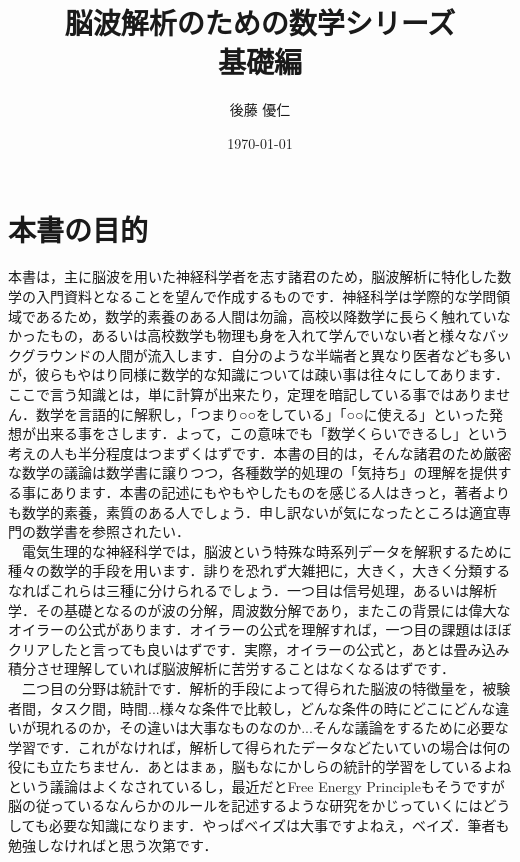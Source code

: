 \documentclass[11pt,a4paper]{ujreport}
\title{脳波解析のための数学シリーズ\\
基礎編}
\author{後藤 優仁}
\date{\today}
\begin{document}
\maketitle
%
%
\tableofcontents

\newpage
\section{本書の目的}
本書は，主に脳波を用いた神経科学者を志す諸君のため，脳波解析に特化した数学の入門資料となることを望んで作成するものです．神経科学は学際的な学問領域であるため，数学的素養のある人間は勿論，高校以降数学に長らく触れていなかったもの，あるいは高校数学も物理も身を入れて学んでいない者と様々なバックグラウンドの人間が流入します．自分のような半端者と異なり医者なども多いが，彼らもやはり同様に数学的な知識については疎い事は往々にしてあります．ここで言う知識とは，単に計算が出来たり，定理を暗記している事ではありません．数学を言語的に解釈し，「つまり○○をしている」「○○に使える」といった発想が出来る事をさします．よって，この意味でも「数学くらいできるし」という考えの人も半分程度はつまずくはずです．本書の目的は，そんな諸君のため厳密な数学の議論は数学書に譲りつつ，各種数学的処理の「気持ち」の理解を提供する事にあります．本書の記述にもやもやしたものを感じる人はきっと，著者よりも数学的素養，素質のある人でしょう．申し訳ないが気になったところは適宜専門の数学書を参照されたい．\\
　電気生理的な神経科学では，脳波という特殊な時系列データを解釈するために種々の数学的手段を用います．誹りを恐れず大雑把に，大きく，大きく分類するなればこれらは三種に分けられるでしょう．一つ目は信号処理，あるいは解析学．その基礎となるのが波の分解，周波数分解であり，またこの背景には偉大なオイラーの公式があります．オイラーの公式を理解すれば，一つ目の課題はほぼクリアしたと言っても良いはずです．実際，オイラーの公式と，あとは畳み込み積分させ理解していれば脳波解析に苦労することはなくなるはずです．\\
　二つ目の分野は統計です．解析的手段によって得られた脳波の特徴量を，被験者間，タスク間，時間...様々な条件で比較し，どんな条件の時にどこにどんな違いが現れるのか，その違いは大事なものなのか...そんな議論をするために必要な学習です．これがなければ，解析して得られたデータなどたいていの場合は何の役にも立たちません．あとはまぁ，脳もなにかしらの統計的学習をしているよねという議論はよくなされているし，最近だとFree Energy Principleもそうですが脳の従っているなんらかのルールを記述するような研究をかじっていくにはどうしても必要な知識になります．やっぱベイズは大事ですよねえ，ベイズ．筆者も勉強しなければと思う次第です．\\\\
\end{document}
